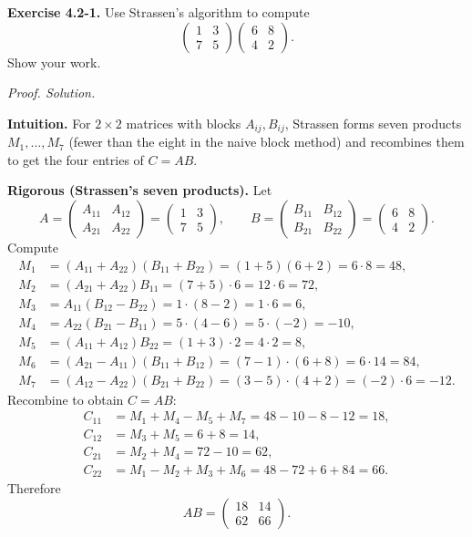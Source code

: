 \documentclass[12pt]{article}
\theoremstyle{definition}
\begin{document}
\newpage

\noindent\textbf{Exercise 4.2-1.}
Use Strassen’s algorithm to compute
\[
\begin{pmatrix}1&3\\[2pt]7&5\end{pmatrix}
\begin{pmatrix}6&8\\[2pt]4&2\end{pmatrix}.
\]
Show your work.

\medskip
\noindent\textit{Proof. Solution.}

\noindent\textbf{Intuition.}
For $2\times2$ matrices with blocks $A_{ij},B_{ij}$, Strassen forms seven products
$M_1,\dots,M_7$ (fewer than the eight in the naive block method) and recombines them
to get the four entries of $C=AB$.

\noindent\textbf{Rigorous (Strassen’s seven products).}
Let
\[
A=\begin{pmatrix}A_{11}&A_{12}\\A_{21}&A_{22}\end{pmatrix}
=\begin{pmatrix}1&3\\7&5\end{pmatrix},\qquad
B=\begin{pmatrix}B_{11}&B_{12}\\B_{21}&B_{22}\end{pmatrix}
=\begin{pmatrix}6&8\\4&2\end{pmatrix}.
\]
Compute
\begin{align*}
M_1&=(A_{11}+A_{22})(B_{11}+B_{22})=(1+5)(6+2)=6\cdot8=48,\\
M_2&=(A_{21}+A_{22})B_{11}=(7+5)\cdot6=12\cdot6=72,\\
M_3&=A_{11}(B_{12}-B_{22})=1\cdot(8-2)=1\cdot6=6,\\
M_4&=A_{22}(B_{21}-B_{11})=5\cdot(4-6)=5\cdot(-2)=-10,\\
M_5&=(A_{11}+A_{12})B_{22}=(1+3)\cdot2=4\cdot2=8,\\
M_6&=(A_{21}-A_{11})(B_{11}+B_{12})=(7-1)\cdot(6+8)=6\cdot14=84,\\
M_7&=(A_{12}-A_{22})(B_{21}+B_{22})=(3-5)\cdot(4+2)=(-2)\cdot6=-12.
\end{align*}
Recombine to obtain $C=AB$:
\begin{align*}
C_{11}&=M_1+M_4-M_5+M_7=48-10-8-12=18,\\
C_{12}&=M_3+M_5=6+8=14,\\
C_{21}&=M_2+M_4=72-10=62,\\
C_{22}&=M_1-M_2+M_3+M_6=48-72+6+84=66.
\end{align*}
Therefore
\[
AB=\begin{pmatrix}18&14\\[2pt]62&66\end{pmatrix}.
\]
\end{document}
